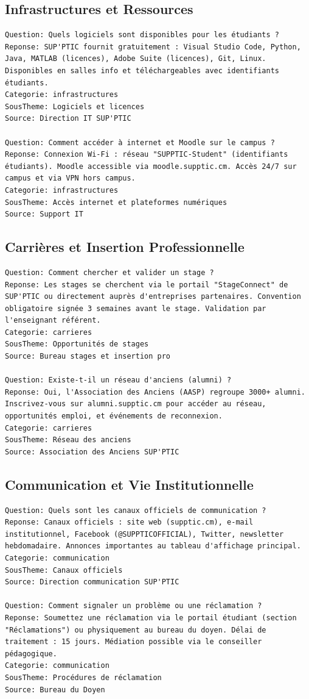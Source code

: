 \documentclass[11pt,a4paper]{article}
\begin{document}
\subsection{Infrastructures et Ressources}
\begin{lstlisting}
Question: Quels logiciels sont disponibles pour les étudiants ?
Reponse: SUP'PTIC fournit gratuitement : Visual Studio Code, Python, Java, MATLAB (licences), Adobe Suite (licences), Git, Linux. Disponibles en salles info et téléchargeables avec identifiants étudiants.
Categorie: infrastructures
SousTheme: Logiciels et licences
Source: Direction IT SUP'PTIC

Question: Comment accéder à internet et Moodle sur le campus ?
Reponse: Connexion Wi-Fi : réseau "SUPPTIC-Student" (identifiants étudiants). Moodle accessible via moodle.supptic.cm. Accès 24/7 sur campus et via VPN hors campus.
Categorie: infrastructures
SousTheme: Accès internet et plateformes numériques
Source: Support IT
\end{lstlisting}

\subsection{Carrières et Insertion Professionnelle}
\begin{lstlisting}
Question: Comment chercher et valider un stage ?
Reponse: Les stages se cherchent via le portail "StageConnect" de SUP'PTIC ou directement auprès d'entreprises partenaires. Convention obligatoire signée 3 semaines avant le stage. Validation par l'enseignant référent.
Categorie: carrieres
SousTheme: Opportunités de stages
Source: Bureau stages et insertion pro

Question: Existe-t-il un réseau d'anciens (alumni) ?
Reponse: Oui, l'Association des Anciens (AASP) regroupe 3000+ alumni. Inscrivez-vous sur alumni.supptic.cm pour accéder au réseau, opportunités emploi, et événements de reconnexion.
Categorie: carrieres
SousTheme: Réseau des anciens
Source: Association des Anciens SUP'PTIC
\end{lstlisting}

\subsection{Communication et Vie Institutionnelle}
\begin{lstlisting}
Question: Quels sont les canaux officiels de communication ?
Reponse: Canaux officiels : site web (supptic.cm), e-mail institutionnel, Facebook (@SUPPTICOFFICIAL), Twitter, newsletter hebdomadaire. Annonces importantes au tableau d'affichage principal.
Categorie: communication
SousTheme: Canaux officiels
Source: Direction communication SUP'PTIC

Question: Comment signaler un problème ou une réclamation ?
Reponse: Soumettez une réclamation via le portail étudiant (section "Réclamations") ou physiquement au bureau du doyen. Délai de traitement : 15 jours. Médiation possible via le conseiller pédagogique.
Categorie: communication
SousTheme: Procédures de réclamation
Source: Bureau du Doyen
\end{lstlisting}
\end{document}
